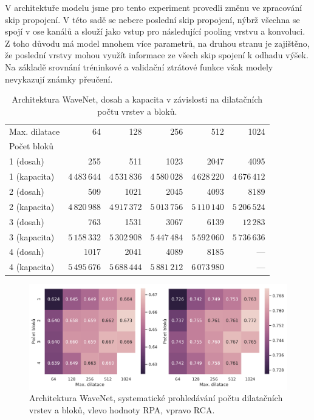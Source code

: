 V architektuře modelu jsme pro tento experiment provedli změnu ve zpracování skip propojení. V této sadě se nebere poslední skip propojení, nýbrž všechna se spojí v ose kanálů a slouží jako vstup pro následující pooling vrstvu a konvoluci. Z toho důvodu má model mnohem více parametrů, na druhou stranu je zajištěno, že poslední vrstvy mohou využít informace ze všech skip spojení k odhadu výšek. Na základě srovnání tréninkové a validační ztrátové funkce však modely nevykazují známky přeučení.

\begin{table}[h!]
\centering
    \begin{tabular}{lrrrrr}
    \toprule
    Max. dilatace & 64 & 128 & 256 & 512 & 1024 \\
    Počet bloků   & {} & {}  & {}  & {}  & {}  \\
    \midrule
    1 (dosah) & 255  & 511  & 1023 & 2047 & 4095 \\
    1 (kapacita) & $4\,483\,644$  & $4\,531\,836$ & $4\,580\,028$ & $4\,628\,220$ & $4\,676\,412$ \\
    2 (dosah) & 509  & 1021 & 2045 & 4093 & 8189 \\
    2 (kapacita) & $4\,820\,988$  & $4\,917\,372$ & $5\,013\,756$ & $5\,110\,140$ & $5\,206\,524$ \\
    3 (dosah) & 763  & 1531 & 3067 & 6139 & $12\,283$ \\
    3 (kapacita) & $5\,158\,332$  & $5\,302\,908$ & $5\,447\,484$ & $5\,592\,060$ & $5\,736\,636$ \\
    4 (dosah) & 1017 & 2041 & 4089 & 8185 & --- \\
    4 (kapacita) & $5\,495\,676$  & $5\,688\,444$ & $5\,881\,212$ & $6\,073\,980$ & --- \\
    \bottomrule
    \end{tabular}
\caption{Architektura WaveNet, dosah a kapacita v závislosti na dilatačních počtu vrstev a bloků.}\label{tab:wavenet_dilation_width_numbers}
\end{table}

\begin{figure}[h]\centering
    \includegraphics[scale=0.5]{../img/figures/wavenet_stacks_gridsearch.pdf}
\caption{Architektura WaveNet, systematické prohledávání počtu dilatačních vrstev a bloků, vlevo hodnoty RPA, vpravo RCA.}\label{obr:wavenet_stacks_gridsearch}
\end{figure}

